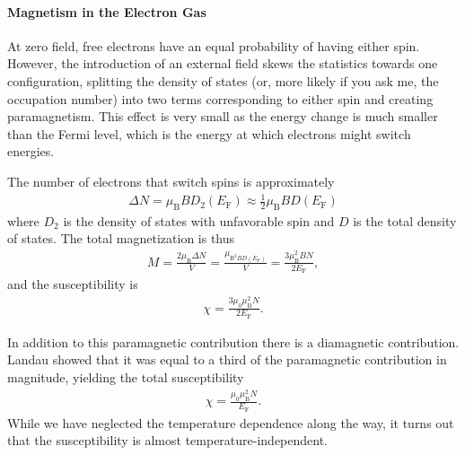 \paragraph{Magnetism in the Electron Gas}
At zero field, free electrons have an equal probability of having either spin. However, the introduction of an external field skews the statistics towards one configuration, splitting the density of states (or, more likely if you ask me, the occupation number) into two terms corresponding to either spin and creating paramagnetism. This effect is very small as the energy change is much smaller than the Fermi level, which is the energy at which electrons might switch energies.

The number of electrons that switch spins is approximately
\begin{align*}
	\Delta N = \mu_{\text{B}}BD_{2}(E_{\text{F}}) \approx \frac{1}{2}\mu_{\text{B}}BD(E_{\text{F}})
\end{align*}
where $D_{2}$ is the density of states with unfavorable spin and $D$ is the total density of states. The total magnetization is thus
\begin{align*}
	M = \frac{2\mu_{\text{B}}\Delta N}{V} = \frac{\mu_{\text{B}^{2}BD(E_{\text{F}})}}{V} = \frac{3\mu_{\text{B}}^{2}BN}{2E_{\text{F}}},
\end{align*}
and the susceptibility is
\begin{align*}
	\chi = \frac{3\mu_{0}\mu_{\text{B}}^{2}N}{2E_{\text{F}}}.
\end{align*}

In addition to this paramagnetic contribution there is a diamagnetic contribution. Landau showed that it was equal to a third of the paramagnetic contribution in magnitude, yielding the total susceptibility
\begin{align*}
	\chi = \frac{\mu_{0}\mu_{\text{B}}^{2}N}{E_{\text{F}}}.
\end{align*}
While we have neglected the temperature dependence along the way, it turns out that the susceptibility is almost temperature-independent.